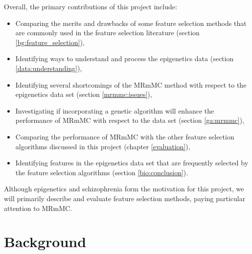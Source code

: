 \documentclass[12pt, twoside, a4paper]{report}
\begin{document}
Overall, the primary contributions of this project include:
\begin{itemize}
  \item Comparing the merits and drawbacks of some feature selection methods that are commonly used in the feature selection literature (section \ref{bg:feature_selection}),
  \item Identifying ways to understand and process the epigenetics data (section \ref{data:understanding}),
  \item Identifying several shortcomings of the MRmMC method with respect to the epigenetics data set (section \ref{mrmmc:issues}),
  \item Investigating if incorporating a genetic algorithm will enhance the performance of MRmMC with respect to the data set (section \ref{ga:mrmmc}),
  \item Comparing the performance of MRmMC with the other feature selection algorithms discussed in this project (chapter \ref{evaluation}),
  \item Identifying features in the epigenetics data set that are frequently selected by the feature selection algorithms (section \ref{bio:conclusion}).
\end{itemize}

Although epigenetics and schizophrenia form the motivation for this project, we will primarily describe and evaluate feature selection methods, paying particular attention to MRmMC.



\chapter{Background}


\end{document}
